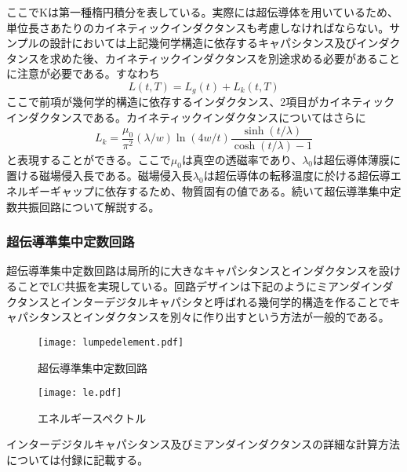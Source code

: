            ここでKは第一種楕円積分を表している。実際には超伝導体を用いているため、単位長さあたりのカイネティックインダクタンスも考慮しなければならない。サンプルの設計においては上記幾何学構造に依存するキャパシタンス及びインダクタンスを求めた後、カイネティックインダクタンスを別途求める必要があることに注意が必要である。すなわち
            \begin{equation}
                L(t, T)=L_{g}(t)+L_{k}(t, T)
            \end{equation}
            ここで前項が幾何学的構造に依存するインダクタンス、2項目がカイネティックインダクタンスである。カイネティックインダクタンスについてはさらに
            \begin{equation}
                L_{k}=\frac{\mu_{0}}{\pi^{2}}(\lambda / w) \ln (4 w / t) \frac{\sinh (t / \lambda)}{\cosh (t / \lambda)-1}
            \end{equation}
            と表現することができる。ここで$\mu_0$は真空の透磁率であり、$\lambda_0$は超伝導体薄膜に置ける磁場侵入長である。磁場侵入長$\lambda_0$は超伝導体の転移温度に於ける超伝導エネルギーギャップに依存するため、物質固有の値である。続いて超伝導準集中定数共振回路について解説する。
        \subsubsection{超伝導準集中定数回路}
            超伝導準集中定数回路は局所的に大きなキャパシタンスとインダクタンスを設けることでLC共振を実現している。回路デザインは下記のようにミアンダインダクタンスとインターデジタルキャパシタと呼ばれる幾何学的構造を作ることでキャパシタンスとインダクタンスを別々に作り出すという方法が一般的である。
        \begin{figure}[H]
            \centering
            \texttt{[image: lumpedelement.pdf]}
            \caption{超伝導準集中定数回路}
        \end{figure}
            \begin{figure}[H]
                \centering
                \texttt{[image: le.pdf]}
                \caption{エネルギースペクトル}
            \end{figure}
            インターデジタルキャパシタンス及びミアンダインダクタンスの詳細な計算方法については付録に記載する。
